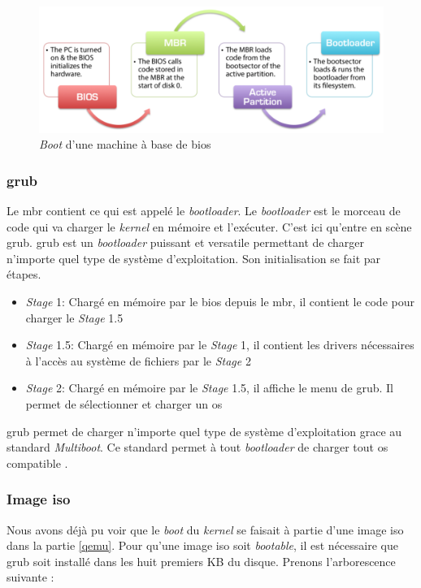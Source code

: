 \begin{figure}[!h]
  \centering
  \includegraphics[scale=0.4]{images/bios_boot.png}
  \caption{\textit{Boot} d'une machine à base de \acrshort{bios}}
\end{figure}


\subsubsection{\acrshort{grub}}
Le \acrshort{mbr} contient ce qui est appelé le \textit{bootloader}. Le \textit{bootloader}
est le morceau de code qui va charger le \textit{kernel} en mémoire et l'exécuter.
C'est ici qu'entre en scène \acrshort{grub}. \acrshort{grub} est un \textit{bootloader}
puissant et versatile permettant de charger n’importe quel type de système d’exploitation.
Son initialisation se fait par étapes.
\begin{itemize}[label=\textbullet]
	\item \textit{Stage} 1: Chargé en mémoire par le \acrshort{bios} depuis le
    \acrshort{mbr}, il contient le code pour charger le \textit{Stage} 1.5
	\item \textit{Stage} 1.5: Chargé en mémoire par le \textit{Stage} 1, il contient
    les drivers nécessaires à l'accès au système de fichiers par le \textit{Stage} 2
	\item \textit{Stage} 2: Chargé en mémoire par le \textit{Stage} 1.5, il affiche
    le menu de \acrshort{grub}. Il permet de sélectionner et charger un \acrshort{os}
\end{itemize}

\acrshort{grub} permet de charger n'importe quel type de système d'exploitation
grace au standard \textit{Multiboot}. Ce standard permet à tout \textit{bootloader}
de charger tout \acrshort{os} compatible \cite{ref42,ref12}.

\subsubsection{Image \acrshort{iso}}
\label{iso}
Nous avons déjà pu voir que le \textit{boot} du \textit{kernel} se faisait à partie
d'une image \acrshort{iso} dans la partie \ref{qemu}. Pour qu'une image \acrshort{iso}
soit \textit{bootable}, il est nécessaire que \acrshort{grub} soit installé dans
les huit premiers KB du disque. Prenons l'arborescence suivante :

